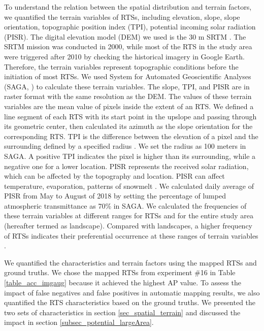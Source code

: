 \documentclass[preprint,12pt,authoryear]{elsarticle}
\begin{document}
To understand the relation between the spatial distribution and terrain factors, we quantified the terrain variables of RTSs, including elevation, slope, slope orientation, topographic position index (TPI), potential incoming solar radiation (PISR). The digital elevation model (DEM) we used is the 30 m SRTM \citep{farr2007shuttle}. The SRTM mission was conducted in 2000, while most of the RTS in the study area were triggered after 2010 by checking the historical imagery in Google Earth. Therefore, the terrain variables represent topographic conditions before the initiation of most RTSs. We used System for Automated Geoscientific Analyses (SAGA, \citealp{conrad2015system}) to calculate these terrain variables. The slope, TPI, and PISR are in raster format with the same resolution as the DEM. The values of these terrain variables are the mean value of pixels inside the extent of an RTS. We defined a line segment of each RTS with its start point in the upslope and passing through its geometric center, then calculated its azimuth as the slope orientation for the corresponding RTS. TPI is the difference between the elevation of a pixel and the surrounding defined by a specified radius \citep{guisan1999glm, reu2013application}. We set the radius as 100 meters in SAGA. A positive TPI indicates the pixel is higher than its surrounding, while a negative one for a lower location. PISR represents the received solar radiation, which can be affected by the topography and location. PISR can affect temperature, evaporation, patterns of snowmelt \citep{bohner2009land}. We calculated daily average of PISR from May to August of 2018 by setting the percentage of lumped atmospheric transmittance as 70\% in SAGA. We calculated the frequencies of these terrain variables at different ranges for RTSs and for the entire study area (hereafter termed as landscape). Compared with landscapes, a higher frequency of RTSs indicates their preferential occurrence at these ranges of terrain variables \citep{lacelle_distribution_2015}. 


We quantified the characteristics and terrain factors using the mapped RTSs and ground truths. We chose the mapped RTSs from experiment \#16 in Table \ref{table_acc_imgaug} because it achieved the highest AP value. To assess the impact of false negatives and false positives in automatic mapping results, we also quantified the RTS characteristics based on the ground truths. We presented the two sets of characteristics in section \ref{sec_spatial_terrain} and discussed the impact in section \ref{subsec_potential_largeArea}. %
\end{document}
